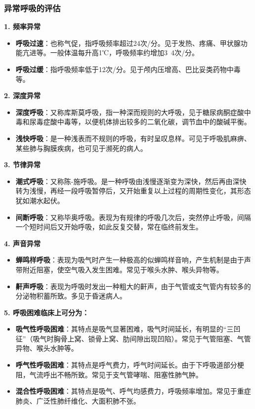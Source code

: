 \documentclass[11pt, a4paper]{ctexart}
\begin{document}
\subsubsection{异常呼吸的评估}
\textbf{1. 频率异常}
\begin{itemize}
    \item \textbf{呼吸过速}：也称气促，指呼吸频率超过24次/分。见于发热、疼痛、甲状腺功能亢进等。一般体温每升高1℃，呼吸频率约增加3~4次/分。
    \item \textbf{呼吸过缓}：指呼吸频率低于12次/分。见于颅内压增高、巴比妥类药物中毒等。
\end{itemize}
\textbf{2. 深度异常}
\begin{itemize}
    \item \textbf{深度呼吸}：又称库斯莫呼吸，指一种深而规则的大呼吸，见于糖尿病酮症酸中毒和尿毒症酸中毒等，以便机体排出较多的二氧化碳，调节血中的酸碱平衡。
    \item \textbf{浅快呼吸}：是一种浅表而不规则的呼吸，有时呈叹息样。可见于呼吸肌麻痹、某些肺与胸膜疾病，也可见于濒死的病人。
\end{itemize}
\textbf{3. 节律异常}
\begin{itemize}
    \item \textbf{潮式呼吸}：又称陈-施呼吸。是一种呼吸由浅慢逐渐变为深快，然后再由深快转为浅慢，再经一段呼吸暂停后，又开始重复以上过程的周期性变化，其形态犹如潮水起伏。
    \item \textbf{间断呼吸}：又称毕奥呼吸。表现为有规律的呼吸几次后，突然停止呼吸，间隔一个短时间后又开始呼吸，如此反复交替，常在临终前发生。
\end{itemize}
\textbf{4. 声音异常}
\begin{itemize}
    \item \textbf{蝉鸣样呼吸}：表现为吸气时产生一种极高的似蝉鸣样音响，产生机制是由于声带附近阻塞，使空气吸入发生困难。常见于喉头水肿、喉头异物等。
    \item \textbf{鼾声呼吸}：表现为呼吸时发出一种粗大的鼾声，由于气管或支气管内有较多的分泌物积蓄所致。多见于昏迷病人。
\end{itemize}
\textbf{5. 呼吸困难临床上可分为：}
\begin{itemize}
    \item \textbf{吸气性呼吸困难}：其特点是吸气显著困难，吸气时间延长，有明显的“三凹征”（吸气时胸骨上窝、锁骨上窝、肋间隙出现凹陷）。常见于气管阻塞、气管异物、喉头水肿等。
    \item \textbf{呼气性呼吸困难}：其特点是呼气费力，呼气时间延长。由于下呼吸道部分梗阻，气流呼出不畅所致。常见于支气管哮喘、阻塞性肺气肿。
    \item \textbf{混合性呼吸困难}：其特点是吸气、呼气均感费力，呼吸频率增加。常见于重症肺炎、广泛性肺纤维化、大面积肺不张。
\end{itemize}
\end{document}
